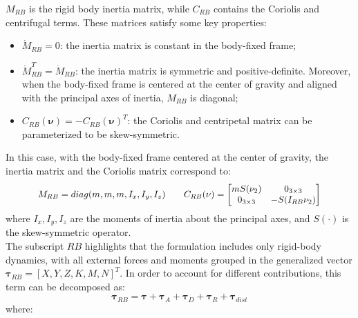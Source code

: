 $M_{RB}$ is the rigid body inertia matrix, while $C_{RB}$ contains the Coriolis and centrifugal terms.
These matrices satisfy some key properties:
\begin{itemize}
    \item $\dot M_{RB} = 0$: the inertia matrix is constant in the body-fixed frame;
    \item $\dot M_{RB}^T = \dot M_{RB}$: the inertia matrix is symmetric and positive-definite. Moreover, when the body-fixed frame is centered at the 
    center of gravity and aligned with the principal axes of inertia, $M_{RB}$ is diagonal;
    \item $C_{RB}(\mathbf{\nu}) = -C_{RB}(\mathbf{\nu})^T$: the Coriolis and centripetal matrix can be parameterized to be skew-symmetric.
\end{itemize}
In this case, with the body-fixed frame centered at the center of gravity, the inertia matrix and the Coriolis matrix correspond to:
\begin{equation}
    \scalebox{0.95}{
        $ M_{RB} = diag(m, m, m, I_x, I_y, I_z) \qquad
        C_{RB}(\mathbf{\nu}) = \begin{bmatrix}
            mS(\mathbf{\nu}_2) & 0_{3 \times 3} \\
            0_{3 \times 3} & -S(I_{RB}\mathbf{\nu}_2)    
        \end{bmatrix} $
    }
    \label{eq:RB_matrices}
\end{equation}
where $I_x, I_y, I_z$ are the moments of inertia about the principal axes, and $S(\cdot)$ is the skew-symmetric operator.\\
The subscript $RB$ highlights that the formulation includes only rigid-body dynamics, with all external forces and moments grouped in the generalized vector
$\mathbf{\tau}_{RB} = [X, Y, Z, K, M, N]^T$. In order to account for different contributions, this term can be decomposed as:
\begin{equation}
    \mathbf{\tau}_{RB} = \mathbf{\tau} + \mathbf{\tau}_{A} + \mathbf{\tau}_{D} + \mathbf{\tau}_{R} + \mathbf{\tau}_{dist}
    \label{eq:6dof_tau_simple}
\end{equation}
where:
